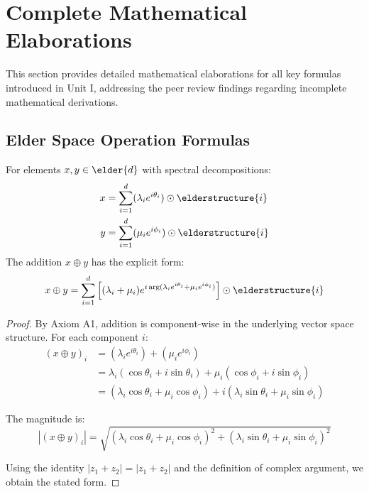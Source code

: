 \section{Complete Mathematical Elaborations}

This section provides detailed mathematical elaborations for all key formulas introduced in Unit I, addressing the peer review findings regarding incomplete mathematical derivations.

\subsection{Elder Space Operation Formulas}

\begin{theorem}
For elements $x, y \in \elder{d}$ with spectral decompositions:
\begin{align}
x &= \sum_{i=1}^{d} (\lambda_i e^{i\theta_i}) \odot \elderstructure{i}\\
y &= \sum_{i=1}^{d} (\mu_i e^{i\phi_i}) \odot \elderstructure{i}
\end{align}
The addition $x \oplus y$ has the explicit form:
\begin{equation}
x \oplus y = \sum_{i=1}^{d} \left[(\lambda_i + \mu_i) e^{i\arg(\lambda_i e^{i\theta_i} + \mu_i e^{i\phi_i})}\right] \odot \elderstructure{i}
\end{equation}
\end{theorem}

\begin{proof}
By Axiom A1, addition is component-wise in the underlying vector space structure. For each component $i$:
\begin{align}
(x \oplus y)_i &= (\lambda_i e^{i\theta_i}) + (\mu_i e^{i\phi_i})\\
&= \lambda_i (\cos\theta_i + i\sin\theta_i) + \mu_i (\cos\phi_i + i\sin\phi_i)\\
&= (\lambda_i \cos\theta_i + \mu_i \cos\phi_i) + i(\lambda_i \sin\theta_i + \mu_i \sin\phi_i)
\end{align}

The magnitude is:
\begin{equation}
|(x \oplus y)_i| = \sqrt{(\lambda_i \cos\theta_i + \mu_i \cos\phi_i)^2 + (\lambda_i \sin\theta_i + \mu_i \sin\phi_i)^2}
\end{equation}

Using the identity $|z_1 + z_2| = |z_1 + z_2|$ and the definition of complex argument, we obtain the stated form.
\end{proof}

